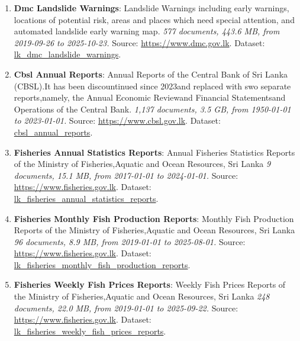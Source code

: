 \documentclass[10pt,a4paper]{article}%
\begin{document}
\begin{enumerate}
\item%
\textbf{Dmc Landslide Warnings}: Landslide Warnings including early warnings, locations of potential risk, areas and places which need special attention, and automated landslide early warning map.\textit{ 577 documents, 443.6 MB, from 2019{-}09{-}26 to 2025{-}10{-}23.} Source: \href{https://www.dmc.gov.lk}{https://www.dmc.gov.lk}. Dataset: \href{https://github.com/nuuuwan/lk\_dmc/tree/data\_lk\_dmc\_landslide\_warnings/data/lk\_dmc\_landslide\_warnings}{lk\_dmc\_landslide\_warnings}.%
\item%
\textbf{Cbsl Annual Reports}: Annual Reports of the Central Bank of Sri Lanka (CBSL).It has been discountinued since 2023and replaced with swo separate reports,namely, the Annual Economic Reviewand Financial Statementsand Operations of the Central Bank.\textit{ 1,137 documents, 3.5 GB, from 1950{-}01{-}01 to 2023{-}01{-}01.} Source: \href{https://www.cbsl.gov.lk}{https://www.cbsl.gov.lk}. Dataset: \href{https://github.com/nuuuwan/cbsl/tree/data\_cbsl\_annual\_reports/data/cbsl\_annual\_reports}{cbsl\_annual\_reports}.%
\item%
\textbf{Fisheries Annual Statistics Reports}: Annual Fisheries Statistics Reports of the Ministry of Fisheries,Aquatic and Ocean Resources, Sri Lanka\textit{ 9 documents, 15.1 MB, from 2017{-}01{-}01 to 2024{-}01{-}01.} Source: \href{https://www.fisheries.gov.lk}{https://www.fisheries.gov.lk}. Dataset: \href{https://github.com/nuuuwan/lk\_fisheries/tree/data\_lk\_fisheries\_annual\_statistics\_reports/data/lk\_fisheries\_annual\_statistics\_reports}{lk\_fisheries\_annual\_statistics\_reports}.%
\item%
\textbf{Fisheries Monthly Fish Production Reports}: Monthly Fish Production Reports of the Ministry of Fisheries,Aquatic and Ocean Resources, Sri Lanka\textit{ 96 documents, 8.9 MB, from 2019{-}01{-}01 to 2025{-}08{-}01.} Source: \href{https://www.fisheries.gov.lk}{https://www.fisheries.gov.lk}. Dataset: \href{https://github.com/nuuuwan/lk\_fisheries/tree/data\_lk\_fisheries\_monthly\_fish\_production\_reports/data/lk\_fisheries\_monthly\_fish\_production\_reports}{lk\_fisheries\_monthly\_fish\_production\_reports}.%
\item%
\textbf{Fisheries Weekly Fish Prices Reports}: Weekly Fish Prices Reports of the Ministry of Fisheries,Aquatic and Ocean Resources, Sri Lanka\textit{ 248 documents, 22.0 MB, from 2019{-}01{-}01 to 2025{-}09{-}22.} Source: \href{https://www.fisheries.gov.lk}{https://www.fisheries.gov.lk}. Dataset: \href{https://github.com/nuuuwan/lk\_fisheries/tree/data\_lk\_fisheries\_weekly\_fish\_prices\_reports/data/lk\_fisheries\_weekly\_fish\_prices\_reports}{lk\_fisheries\_weekly\_fish\_prices\_reports}.%

\end{enumerate}
\end{document}
